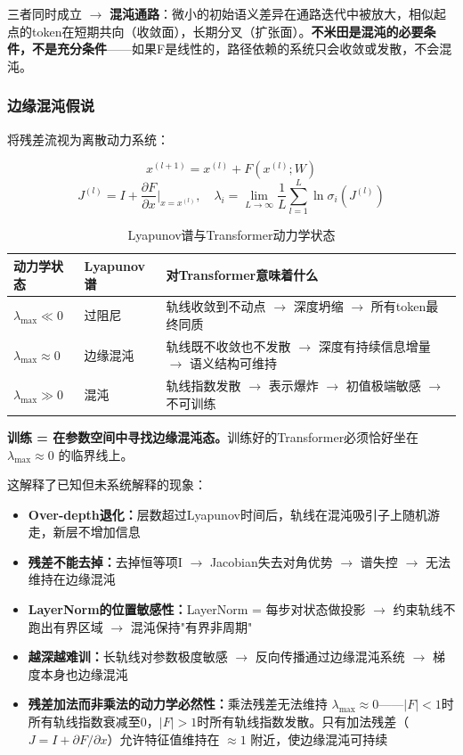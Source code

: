 \documentclass[11pt,a4paper]{article}
\theoremstyle{definition}
\begin{document}
三者同时成立 $\to$ \textbf{混沌通路}：微小的初始语义差异在通路迭代中被放大，相似起点的token在短期共向（收敛面），长期分叉（扩张面）。\textbf{不米田是混沌的必要条件，不是充分条件}——如果F是线性的，路径依赖的系统只会收敛或发散，不会混沌。

\subsubsection{边缘混沌假说}

将残差流视为离散动力系统：

\begin{equation}
x^{(l+1)} = x^{(l)} + F(x^{(l)}; W)
\end{equation}
\begin{equation}
J^{(l)} = I + \frac{\partial F}{\partial x}\Big|_{x=x^{(l)}}, \quad \lambda_i = \lim_{L \to \infty} \frac{1}{L} \sum_{l=1}^L \ln \sigma_i(J^{(l)})
\end{equation}

\begin{table}[H]
\centering
\caption{Lyapunov谱与Transformer动力学状态}
\begin{tabular}{@{}p{2.5cm}p{4.5cm}p{5cm}@{}}
\toprule
\textbf{动力学状态} & \textbf{Lyapunov谱} & \textbf{对Transformer意味着什么} \\
\midrule
$\lambda_{\max} \ll 0$ & 过阻尼 & 轨线收敛到不动点 $\to$ 深度坍缩 $\to$ 所有token最终同质 \\
$\lambda_{\max} \approx 0$ & 边缘混沌 & 轨线既不收敛也不发散 $\to$ 深度有持续信息增量 $\to$ 语义结构可维持 \\
$\lambda_{\max} \gg 0$ & 混沌 & 轨线指数发散 $\to$ 表示爆炸 $\to$ 初值极端敏感 $\to$ 不可训练 \\
\bottomrule
\end{tabular}
\end{table}

\textbf{训练 = 在参数空间中寻找边缘混沌态。}训练好的Transformer必须恰好坐在 $\lambda_{\max} \approx 0$ 的临界线上。

这解释了已知但未系统解释的现象：
\begin{itemize}[leftmargin=*,itemsep=0.2em]
    \item \textbf{Over-depth退化：}层数超过Lyapunov时间后，轨线在混沌吸引子上随机游走，新层不增加信息
    \item \textbf{残差不能去掉：}去掉恒等项I $\to$ Jacobian失去对角优势 $\to$ 谱失控 $\to$ 无法维持在边缘混沌
    \item \textbf{LayerNorm的位置敏感性：}LayerNorm = 每步对状态做投影 $\to$ 约束轨线不跑出有界区域 $\to$ 混沌保持"有界非周期"
    \item \textbf{越深越难训：}长轨线对参数极度敏感 $\to$ 反向传播通过边缘混沌系统 $\to$ 梯度本身也边缘混沌
    \item \textbf{残差加法而非乘法的动力学必然性：}乘法残差无法维持 $\lambda_{\max} \approx 0$——$|F|<1$时所有轨线指数衰减至0，$|F|>1$时所有轨线指数发散。只有加法残差（$J = I + \partial F/\partial x$）允许特征值维持在 $\approx 1$ 附近，使边缘混沌可持续
\end{itemize}
\end{document}
